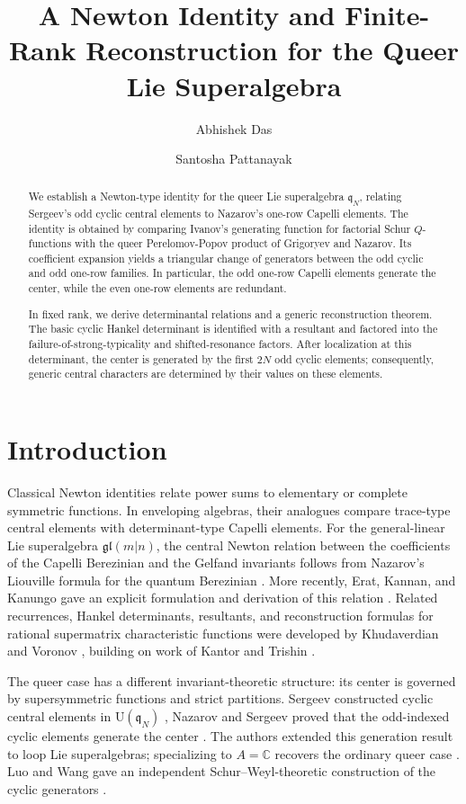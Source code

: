 \documentclass[11pt]{amsart}
\title[Newton identity for the queer Lie superalgebra]
{A Newton Identity and Finite-Rank Reconstruction
for the Queer Lie Superalgebra}
\author[A. Das]{Abhishek Das}
\author[S. Pattanayak]{Santosha Pattanayak}
\numberwithin{equation}{section}
\theoremstyle{definition}
\theoremstyle{remark}
\newcommand{\C}{\mathbb C}
\newcommand{\gl}{\mathfrak{gl}}
\newcommand{\q}{\mathfrak q}
\newcommand{\U}{\mathrm U}
\begin{document}
\begin{abstract}
We establish a Newton-type identity for the queer Lie superalgebra
\(\mathfrak q_N\), relating Sergeev's odd cyclic central elements to
Nazarov's one-row Capelli elements.  The identity is obtained by
comparing Ivanov's generating function for factorial Schur
\(Q\)-functions with the queer Perelomov-Popov product of Grigoryev
and Nazarov.  Its coefficient expansion yields a triangular change of
generators between the odd cyclic and odd one-row families.  In
particular, the odd one-row Capelli elements generate the center, while
the even one-row elements are redundant.

In fixed rank, we derive determinantal relations and a generic
reconstruction theorem.  The basic cyclic Hankel determinant is
identified with a resultant and factored into the
failure-of-strong-typicality and shifted-resonance factors.  After
localization at this determinant, the center is generated by the first
\(2N\) odd cyclic elements; consequently, generic central characters
are determined by their values on these elements.
\end{abstract}

\maketitle

\section{Introduction}

Classical Newton identities relate power sums to elementary or complete
symmetric functions.  In enveloping algebras, their analogues compare
trace-type central elements with determinant-type Capelli elements.
For the general-linear Lie superalgebra \(\gl(m|n)\), the central
Newton relation between the coefficients of the Capelli Berezinian and
the Gelfand invariants follows from Nazarov's Liouville formula for the
quantum Berezinian \cite{Nazarov1991}.  More recently, Erat, Kannan,
and Kanungo gave an explicit formulation and derivation of this
relation \cite[Theorem~6.2.1]{EKK2025}.  Related recurrences, Hankel
determinants, resultants, and reconstruction formulas for rational
supermatrix characteristic functions were developed by Khudaverdian
and Voronov \cite{KV2005}, building on work of Kantor and Trishin
\cite{KT1997,KT1999}.

The queer case has a different invariant-theoretic structure: its
center is governed by supersymmetric functions and strict partitions.
Sergeev constructed cyclic central elements in \(\U(\q_N)\)
\cite{Sergeev1983}, Nazarov and Sergeev proved that the odd-indexed
cyclic elements generate the center
\cite[Proposition~1.1]{NazarovSergeev2006}.  The authors extended this
generation result to loop Lie superalgebras; specializing to
\(A=\C\) recovers the ordinary queer case
\cite[Theorem~5.3]{DP2025}.  Luo and Wang gave an independent
Schur--Weyl-theoretic construction of the cyclic generators
\cite[Section~3.2 and Proposition~3.12]{LuoWang2025}.
\end{document}
